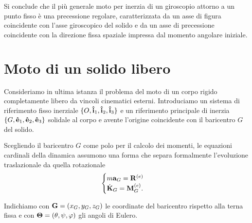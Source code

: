 Si conclude che il più generale moto per inerzia di un giroscopio attorno a un punto fisso è una precessione regolare, caratterizzata da un asse di figura coincidente con l'asse giroscopico del solido e da un asse di precessione coincidente con la direzione fissa spaziale impressa dal momento angolare iniziale.

\section{Moto di un solido libero}
Consideriamo in ultima istanza il problema del moto di un corpo rigido completamente libero da vincoli cinematici esterni. Introduciamo un sistema di riferimento fisso inerziale $\{O, \vu{i}_1, \vu{i}_2, \vu{i}_3\}$ e un riferimento principale di inerzia $\{G, \vu{e}_1, \vu{e}_2, \vu{e}_3\}$ solidale al corpo e avente l'origine coincidente con il baricentro $G$ del solido.

Scegliendo il baricentro $G$ come polo per il calcolo dei momenti, le equazioni cardinali della dinamica assumono una forma che separa formalmente l'evoluzione traslazionale da quella rotazionale
\begin{equation*}
    \begin{cases}
        m\vb{a}_G = \vb{R}^{(e)} \\
        \dot{\vb{K}}_G = \vb{M}_G^{(e)}.
    \end{cases}
\end{equation*}

Indichiamo con $\vb{G} = (x_G, y_G, z_G)$ le coordinate del baricentro rispetto alla terna fissa e con $\vb{\Theta} = (\theta, \psi, \varphi)$ gli angoli di Eulero. 

